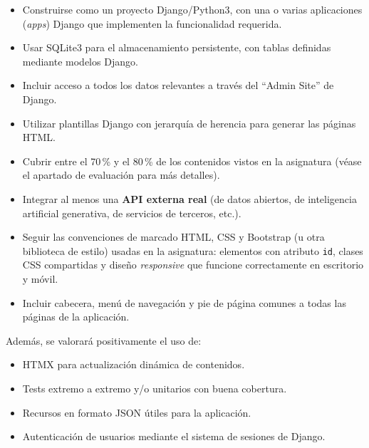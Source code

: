 \begin{itemize}

\item Construirse como un proyecto Django/Python3, con una o varias aplicaciones (\emph{apps}) Django que implementen la funcionalidad requerida.

\item Usar SQLite3 para el almacenamiento persistente, con tablas definidas mediante modelos Django.

\item Incluir acceso a todos los datos relevantes a través del ``Admin Site'' de Django.

\item Utilizar plantillas Django con jerarquía de herencia para generar las páginas HTML.

\item Cubrir entre el 70\,\% y el 80\,\% de los contenidos vistos en la asignatura (véase el apartado de evaluación para más detalles).

\item Integrar al menos una \textbf{API externa real} (de datos abiertos, de inteligencia artificial generativa, de servicios de terceros, etc.).

\item Seguir las convenciones de marcado HTML, CSS y Bootstrap (u otra biblioteca de estilo) usadas en la asignatura: elementos con atributo \texttt{id}, clases CSS compartidas y diseño \emph{responsive} que funcione correctamente en escritorio y móvil.

\item Incluir cabecera, menú de navegación y pie de página comunes a todas las páginas de la aplicación.

\end{itemize}

Además, se valorará positivamente el uso de:

\begin{itemize}
\item HTMX para actualización dinámica de contenidos.
\item Tests extremo a extremo y/o unitarios con buena cobertura.
\item Recursos en formato JSON útiles para la aplicación.
\item Autenticación de usuarios mediante el sistema de sesiones de Django.
\end{itemize}

